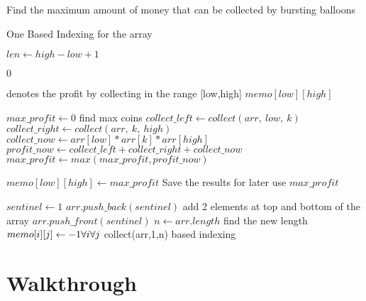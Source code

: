\documentclass[12pt]{article}
\newcommand{\In}{\textbf{ in }}
\begin{document}
\begin{algorithm}

  \caption{Find the maximum amount of money that can be collected by bursting balloons}
\begin{algorithmic}[1]
    \Ensure One Based Indexing for the array
    \Statex
 
       
       \State $len \gets high-low+1$
       
 	 	  \State \Return $0$
 	   \EndIf
       
       \Statex
   
         \Comment denotes the profit by collecting in the range [low,high]
            \State  \Return $memo[low][high]$
        \EndIf
        
        \Statex
        
        \State $max\_profit \gets 0$
        \For {$k \In [low + 1, high - 1]$} \Comment find max coins
            \State $collect\_ left \gets collect(arr, \ low, \ k)$
            \State $collect\_ right\gets collect(arr, \ k, \ high)$
            \State $collect\_ now \gets arr[low]*arr[k]*arr[high]$   
            \State $profit\_ now \gets collect\_ left+collect\_ right+collect\_ now$
            \State $max \_ profit \gets max(max\_ profit,profit\_ now)$
        \EndFor
        
        \Statex
        \State $memo[low][high] \gets max\_profit$  \Comment Save the results for later use
        \State \Return $max\_profit$
   \EndFunction
   
   \Statex
   \Statex
   
        \State $sentinel \gets 1$
        \State $arr.push\_back(sentinel)$		\Comment add 2 elements at top and bottom of the array
        \State $arr.push\_front(sentinel)$                
        \State $n \gets arr.length$                \Comment find the new length    
        \State $memo[i][j] \gets -1 \hfill \forall i \hfill \forall j$                    
        \State \Return collect(arr,1,n)              based indexing
    \EndFunction
    
    
    \section*{Walkthrough}
\begin{enumerate}


\end{enumerate}
\end{algorithmic}
\end{algorithm}
\end{document}
